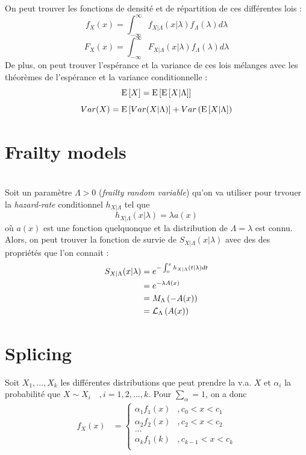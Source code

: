 \documentclass[12pt, french]{report}
\begin{document}
On peut trouver les fonctions de densité et de répartition de ces différentes lois : 
\begin{equation}
f_X(x) = \int_{- \infty}^{\infty} f_{X|\Lambda}(x | \lambda) f_\Lambda(\lambda) d \lambda
\end{equation}
\begin{equation}
F_X(x) = \int_{- \infty}^{\infty} F_{X | \Lambda}(x | \lambda) f_\Lambda(\lambda) d \lambda
\end{equation}
De plus, on peut trouver l'espérance et la variance de ces lois mélanges avec les théorèmes de l'espérance et la variance conditionnelle : 
\begin{equation}
\mathrm{E} \left[ X \right] = \mathrm{E} \left[  \mathrm{E} \left[ X | \Lambda \right]  \right]
\end{equation}
\begin{equation}
Var(X) = \mathrm{E} \left[ Var(X | \Lambda) \right] + Var \left( \mathrm{E} \left[ X | \Lambda \right]   \right)
\end{equation}


\section{Frailty models}
 \\

Soit un paramètre $\Lambda > 0$ (\emph{frailty random variable}) qu'on va utiliser pour trvouer la \emph{hazard-rate} conditionnel $h_{X | \Lambda}$ tel que
\begin{equation}
h_{X | \Lambda}(x | \lambda) = \lambda a(x)
\end{equation}
où $a(x)$ est une fonction quelquonque et la distribution de $\Lambda = \lambda$ est connu. Alors, on peut trouver la fonction de survie de $S_{X | \Lambda}(x | \lambda)$ avec des des propriétés que l'on connait : 
\begin{align*}
S_{X | \Lambda}(x | \lambda) & = e^{- \int_{0}^{x} h_{X | \Lambda}(t | \lambda) dt} \\
	& = e^{- \lambda A(x)} \\
	& = M_\Lambda \left( - A(x) \right) \\
	& = \mathcal{L}_\Lambda \left( A(x) \right) \\
\end{align*}


\section{Splicing}
Soit $X_1, ..., X_k$ les différentes distributions que peut prendre la v.a. $X$ et $\alpha_i$ la probabilité que $X \sim X_i \quad , i = 1,2, ..., k$.  Pour $\sum_ \alpha = 1$, on a donc
\begin{align*}
f_X(x)	& = 
\begin{cases}
\alpha_1 f_1(x)	& , c_0 < x < c_1 \\
\alpha_2 f_2(x)	& , c_2 < x < c_2 \\
...							& \\
\alpha_k f_1(k)	& , c_{k-1} < x < c_k \\
\end{cases}
\end{align*}
\end{document}
